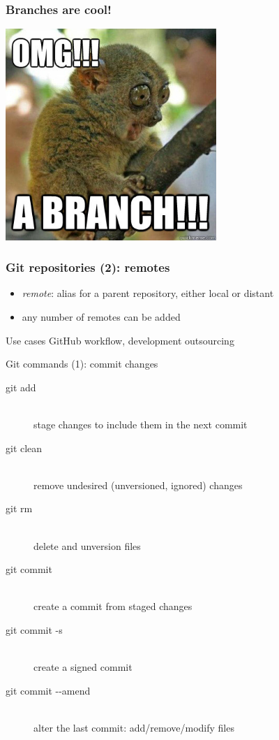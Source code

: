 \documentclass{beamer}
\begin{document}
\begin{frame}
  \frametitle{Branches are cool!}
  \begin{center}
    \includegraphics[width=0.6\textwidth]{img/omgabranch.jpg}
  \end{center}
\end{frame}

\begin{frame}
  \frametitle{Git repositories (2): remotes}

  \begin{itemize}[<+->]
    \item \textit{remote}: alias for a parent repository,
      either local or distant
    \item any number of remotes can be added
  \end{itemize}
  \pause
  \begin{block}{Use cases}
    GitHub workflow, development outsourcing
  \end{block}
\end{frame}

\begin{frame}{Git commands (1): commit changes}
  \begin{description}
    \item[git add] \hfill \\
      stage changes to include them in the next commit
    \item[git clean] \hfill \\
      remove undesired (unversioned, ignored) changes
    \item[git rm] \hfill \\
      delete and unversion files
    \item[git commit] \hfill \\
      create a commit from staged changes
    \item[git commit -s] \hfill \\
      create a signed commit
    \item[git commit -{}-amend] \hfill \\
      alter the last commit: add/remove/modify files
  \end{description}
\end{frame}
\end{document}
